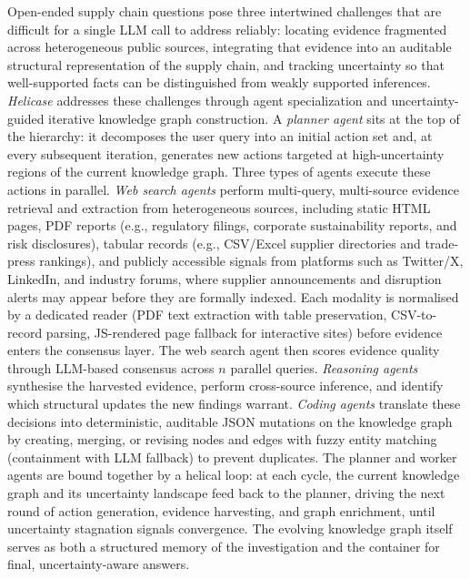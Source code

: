 \documentclass{article}
\begin{document}
Open-ended supply chain questions pose three intertwined challenges that are difficult for a single LLM call to address reliably: locating evidence fragmented across heterogeneous public sources, integrating that evidence into an auditable structural representation of the supply chain, and tracking uncertainty so that well-supported facts can be distinguished from weakly supported inferences. \textit{Helicase} addresses these challenges through agent specialization and uncertainty-guided iterative knowledge graph construction. A \emph{planner agent} sits at the top of the hierarchy: it decomposes the user query into an initial action set and, at every subsequent iteration, generates new actions targeted at high-uncertainty regions of the current knowledge graph. Three types of agents execute these actions in parallel. \emph{Web search agents} perform multi-query, multi-source evidence retrieval and extraction from heterogeneous sources, including static HTML pages, PDF reports (e.g., regulatory filings, corporate sustainability reports, and risk disclosures), tabular records (e.g., CSV/Excel supplier directories and trade-press rankings), and publicly accessible signals from platforms such as Twitter/X, LinkedIn, and industry forums, where supplier announcements and disruption alerts may appear before they are formally indexed. Each modality is normalised by a dedicated reader (PDF text extraction with table preservation, CSV-to-record parsing, JS-rendered page fallback for interactive sites) before evidence enters the consensus layer. The web search agent then scores evidence quality through LLM-based consensus across $n$ parallel queries. \emph{Reasoning agents} synthesise the harvested evidence, perform cross-source inference, and identify which structural updates the new findings warrant. \emph{Coding agents} translate these decisions into deterministic, auditable JSON mutations on the knowledge graph by creating, merging, or revising nodes and edges with fuzzy entity matching (containment with LLM fallback) to prevent duplicates. The planner and worker agents are bound together by a helical loop: at each cycle, the current knowledge graph and its uncertainty landscape feed back to the planner, driving the next round of action generation, evidence harvesting, and graph enrichment, until uncertainty stagnation signals convergence. The evolving knowledge graph itself serves as both a structured memory of the investigation and the container for final, uncertainty-aware answers.
\end{document}
